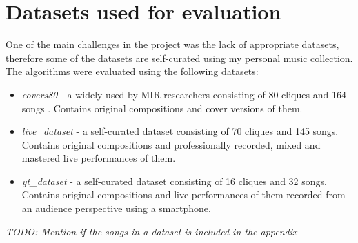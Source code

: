 \section{Datasets used for evaluation} 
\label{sec:datasets}
One of the main challenges in the project was the lack of appropriate datasets,
therefore some of the datasets are self-curated using my personal music
collection. The algorithms were evaluated using the following datasets:
\begin{itemize}
    \item \textit{covers80} - a widely used by MIR researchers consisting of 80
    cliques and 164 songs \cite{covers80}. Contains original compositions and
    cover versions of them.
    \item \textit{live\_dataset} - a self-curated dataset consisting of 70
    cliques and 145 songs. Contains original compositions and professionally
    recorded, mixed and mastered live performances of them.
    \item \textit{yt\_dataset} - a self-curated dataset consisting of 16 cliques
    and 32 songs. Contains original compositions and live performances of them
    recorded from an audience perspective using a smartphone.
\end{itemize}

\textit{TODO: Mention if the songs in a dataset is included in the appendix}
